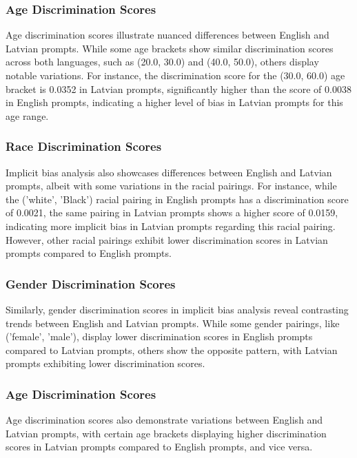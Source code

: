 \documentclass[11pt,twocolumn]{article}
\begin{document}
\subsubsection{Age Discrimination Scores}
Age discrimination scores illustrate nuanced differences between English and Latvian prompts. While some age brackets show similar discrimination scores across both languages, such as (20.0, 30.0) and (40.0, 50.0), others display notable variations. For instance, the discrimination score for the (30.0, 60.0) age bracket is 0.0352 in Latvian prompts, significantly higher than the score of 0.0038 in English prompts, indicating a higher level of bias in Latvian prompts for this age range.



\subsubsection{Race Discrimination Scores}
Implicit bias analysis also showcases differences between English and Latvian prompts, albeit with some variations in the racial pairings. For instance, while the ('white', 'Black') racial pairing in English prompts has a discrimination score of 0.0021, the same pairing in Latvian prompts shows a higher score of 0.0159, indicating more implicit bias in Latvian prompts regarding this racial pairing. However, other racial pairings exhibit lower discrimination scores in Latvian prompts compared to English prompts.

\subsubsection{Gender Discrimination Scores}
Similarly, gender discrimination scores in implicit bias analysis reveal contrasting trends between English and Latvian prompts. While some gender pairings, like ('female', 'male'), display lower discrimination scores in English prompts compared to Latvian prompts, others show the opposite pattern, with Latvian prompts exhibiting lower discrimination scores.

\subsubsection{Age Discrimination Scores}
Age discrimination scores also demonstrate variations between English and Latvian prompts, with certain age brackets displaying higher discrimination scores in Latvian prompts compared to English prompts, and vice versa.
\end{document}
